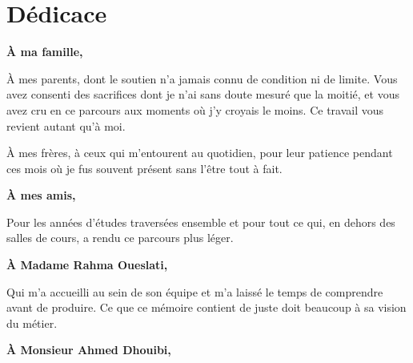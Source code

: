 \chapter*{\Huge Dédicace}
\vspace{2mm}

\begin{center}
\begin{minipage}{0.84\textwidth}
\itshape

\begin{center}
\textbf{\large À ma famille,}
\end{center}

\vspace{2mm}

À mes parents, dont le soutien n'a jamais connu de condition ni de limite. Vous avez consenti des
sacrifices dont je n'ai sans doute mesuré que la moitié, et vous avez cru en ce parcours aux
moments où j'y croyais le moins. Ce travail vous revient autant qu'à moi.

\vspace{4mm}

À mes frères, à ceux qui m'entourent au quotidien, pour leur patience pendant ces mois où
je fus souvent présent sans l'être tout à fait.

\vspace{6mm}

\begin{center}
\textbf{\large À mes amis,}
\end{center}

\vspace{2mm}

Pour les années d'études traversées ensemble et pour tout ce qui, en dehors des salles de
cours, a rendu ce parcours plus léger.

\vspace{6mm}

\begin{center}
\textbf{\large À Madame Rahma Oueslati,}
\end{center}

\vspace{2mm}

Qui m'a accueilli au sein de son équipe et m'a laissé le temps de comprendre avant de produire. Ce
que ce mémoire contient de juste doit beaucoup à sa vision du métier.

\vspace{6mm}

\begin{center}
\textbf{\large À Monsieur Ahmed Dhouibi,}
\end{center}


\end{minipage}
\end{center}
